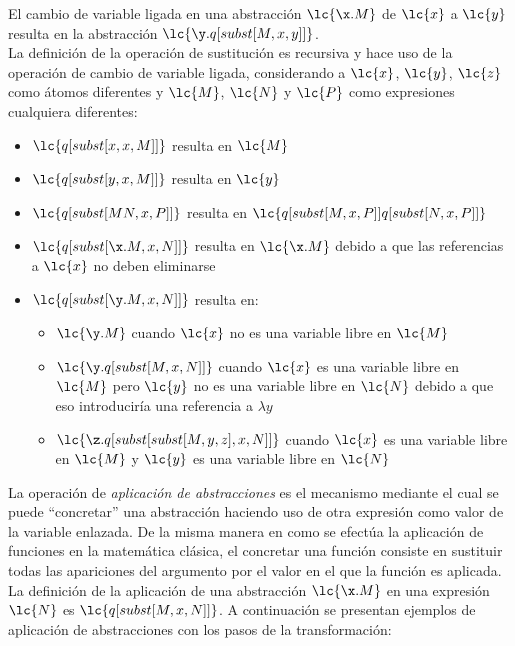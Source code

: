 El cambio de variable ligada en una abstracción \(\lc{\x.M}\) de \(\lc{x}\) a
\(\lc{y}\) resulta en la abstracción \(\lc{\y.q[subst[M,x,y]]}\). \\

La definición de la operación de sustitución es recursiva y hace uso de la
operación de cambio de variable ligada, considerando a \(\lc{x}\), \(\lc{y}\),
\(\lc{z}\) como átomos diferentes y \(\lc{M}\), \(\lc{N}\) y \(\lc{P}\) como
expresiones cualquiera diferentes:

\begin{itemize}
\item \(\lc{q[subst[x,x,M]]}\) resulta en \(\lc{M}\)
\item \(\lc{q[subst[y,x,M]]}\) resulta en \(\lc{y}\)
\item \(\lc{q[subst[M N, x, P]]}\) resulta en \(\lc{q[subst[M, x, P]] q[subst[N,
    x, P]]}\)
\item \(\lc{q[subst[\x.M, x, N]]}\) resulta en \(\lc{\x.M}\) debido a que las
  referencias a \(\lc{x}\) no deben eliminarse
\item \(\lc{q[subst[\y.M, x, N]]}\) resulta en:
  \begin{itemize}
  \item \(\lc{\y.M}\) cuando \(\lc{x}\) no es una variable libre en \(\lc{M}\)
  \item \(\lc{\y.q[subst[M, x, N]]}\) cuando \(\lc{x}\) es una variable libre en
    \(\lc{M}\) pero \(\lc{y}\) no es una variable libre en \(\lc{N}\) debido a que
    eso introduciría una referencia a \(\lambda y\)
  \item \(\lc{\z.q[subst[subst[M,y,z],x,N]]}\) cuando \(\lc{x}\) es una variable
    libre en \(\lc{M}\) y \(\lc{y}\) es una variable libre en \(\lc{N}\)
  \end{itemize}
\end{itemize}

La operación de \emph{aplicación de abstracciones} es el mecanismo mediante el cual
se puede ``concretar'' una abstracción haciendo uso de otra expresión como valor
de la variable  enlazada. De la misma manera en como se efectúa la
aplicación de funciones en la matemática clásica, el concretar una función
consiste en sustituir todas las apariciones del argumento por el valor en el que
la función es aplicada. \\

La definición de la aplicación de una abstracción \(\lc{\x.M}\) en una expresión
\(\lc{N}\) es \(\lc{q[subst[M,x,N]]}\). A continuación se presentan ejemplos de
aplicación de abstracciones con los pasos de la transformación: \\

